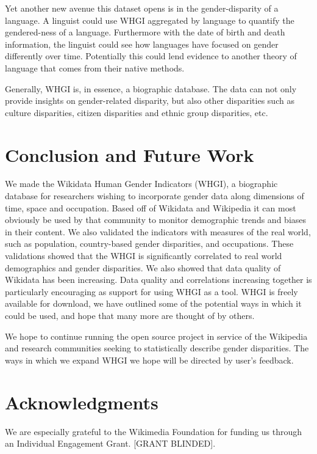 \documentclass[letterpaper]{article}
\begin{document}
Yet another new avenue this dataset opens is in the gender-disparity of a language. A linguist could use WHGI aggregated by language to quantify the gendered-ness of a language. Furthermore with the date of birth and death information, the linguist could see how languages have focused on gender differently over time. Potentially this could lend evidence to another theory of language that comes from their native methods. 

Generally, WHGI is, in essence, a biographic database. The data can not only provide insights on gender-related disparity, but also other disparities such as culture disparities, citizen disparities and ethnic group disparities, etc.  

\section{Conclusion and Future Work}
We made the Wikidata Human Gender Indicators (WHGI), a biographic database for researchers wishing to incorporate gender data along dimensions of time, space and occupation. Based off of Wikidata and Wikipedia it can most obviously be used by that community to monitor demographic trends and biases in their content. We also validated the indicators with measures of the real world, such as population, country-based gender disparities, and occupations. These validations showed that the WHGI is significantly correlated to real world demographics and gender disparities. We also showed that data quality of Wikidata has been increasing. Data quality and correlations increasing together is particularly encouraging as support for using WHGI as a tool. WHGI is freely available for download, we have outlined some of the potential ways in which it could be used, and hope that many more are thought of by others.

We hope to continue running the open source project in service of the Wikipedia and research communities seeking to statistically describe gender disparities. The ways in which we expand WHGI we hope will be directed by user's feedback.

\section{ Acknowledgments}
We are especially grateful to the Wikimedia Foundation for funding us through an Individual Engagement Grant. [GRANT BLINDED].



\end{document}
